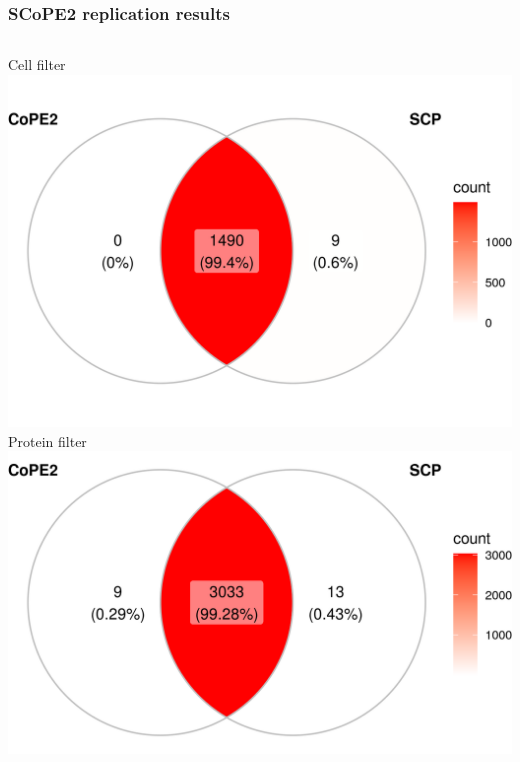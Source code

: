 \documentclass{beamer}
\begin{document}
\begin{frame}
  \frametitle{SCoPE2 replication results}
  
  \vfill
  \begin{columns}
  
    Cell filter\\
    \includegraphics[width=\linewidth]{figs/cell_filter.png}\\
    Protein filter\\
    \includegraphics[width=\linewidth]{figs/protein_filter.png}\\
  

\end{columns}
\end{frame}
\end{document}
